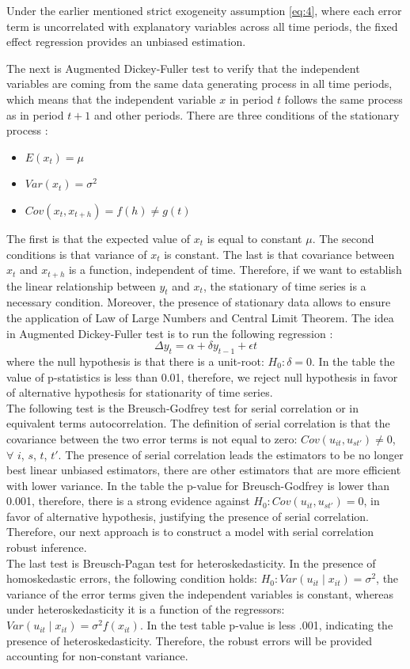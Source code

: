 \documentclass[titlepage, 11pt]{article}
\begin{document}
Under the earlier mentioned strict exogeneity assumption \ref{eq:4}, where each error term is uncorrelated with explanatory variables across all time periods, the fixed effect regression provides an unbiased estimation.


\tab The next is Augmented Dickey-Fuller test to verify that the independent variables are coming from the same data generating process in all time periods, which means that the independent variable $x$ in period $t$ follows the same process as in period $t+1$ and other periods. There are three conditions of the stationary process \cite{book}:
\begin{itemize}
\item $E(x_{t}) = \mu$ 
\item $Var(x_{t}) = \sigma^2$
\item $Cov(x_t, x_{t+h}) = f(h)\neq g(t) $
\end{itemize}
The first is that the expected value of $x_t$ is equal to  constant $\mu$. The second conditions is that variance of $x_t$ is constant. The last is that covariance between $x_t$ and $x_{t+h}$ is a function, independent of time. Therefore, if we want to establish the linear relationship between $y_t$ and $x_t$, the stationary of time series is a necessary condition. Moreover, the presence of stationary data allows to ensure the application of Law of Large Numbers and Central Limit Theorem. The idea in Augmented Dickey-Fuller test is to run the following regression \cite{book}: 
\begin{equation}
\Delta y_t = \alpha + \delta y_{t-1} + \epsilon{t} 
\end{equation}
where the null hypothesis is that there is a unit-root: $H_0: \delta = 0$. In the table the value of p-statistics is less than 0.01, therefore, we reject null hypothesis in favor of alternative hypothesis for stationarity of time series. \\
\tab The following test is the Breusch-Godfrey test for serial correlation or in equivalent terms autocorrelation. The definition of serial correlation is that the covariance between the two error terms is not equal to zero\cite{book}: $Cov(u_{it}, u_{st'}) \neq 0$, $\forall$ $i$, $s$, $t$, $t'$. The presence of serial correlation leads the estimators to be no longer best linear unbiased estimators, there are other estimators that are more efficient with lower variance. In the table the p-value for Breusch-Godfrey is lower than 0.001, therefore, there is a strong evidence against $H_0:Cov(u_{it}, u_{st'})=0$, in favor of alternative hypothesis, justifying the presence of serial correlation. Therefore, our next approach is to construct a model with serial correlation robust inference. \\
\tab The last test is Breusch-Pagan test for heteroskedasticity. In the presence of homoskedastic errors, the following condition holds:  $H_0:Var(u_{it}\mid x_{it}) = \sigma^2$, the variance of the error terms given the independent variables is constant, whereas under heteroskedasticity it is a function of the regressors:  $Var(u_{it}\mid x_{it}) = \sigma^2f(x_{it})$. In the test table p-value is less .001, indicating the presence of heteroskedasticity. Therefore, the robust errors will be provided accounting for non-constant variance. 
\end{document}
